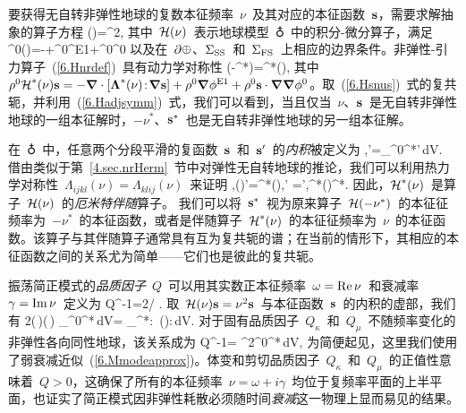 要获得无自转非弹性地球的复数本征频率~$\nu$~及其对应的本征函数~$\bs$，需要求解抽象的算子方程
\eq
\label{6.Hsnus}
\sH(\nu)\bs=\nu^2\bs,
\en
其中~$\sH(\nu)$~表示地球模型~$\earth$~中的积分-微分算子，满足
%
%
\eq
\label{6.Hnrdef}
\rho^0\sH(\nu)\bs=-\bdel\cdot[\bLambda(\nu)\!:\!\bdel\bs]
+\rho^0\bdel\phi^{\rm E1}+\rho^0\bs\cdot\bdel\bdel\phi^0
\en
以及在~$\p\earth$、$\Sigma_{\rm SS}$~和~$\Sigma_{\rm FS}$~上相应的边界条件。非弹性-引力算子~(\ref{6.Hnrdef})~具有动力学对称性
\eq
\label{6.Hadjsymm}
\sH(-\nu^*)=\sH^*(\nu),
\en
其中~$\rho^0\sH^*(\nu)\bs=-\bdel\cdot[\bLambda^*(\nu)\!:\!\bdel\bs]
+\rho^0\bdel\phi^{\rm E1}+\rho^0\bs\cdot\bdel\bdel\phi^0$。取~(\ref{6.Hsnus})~式的复共轭，并利用~(\ref{6.Hadjsymm})~式，我们可以看到，当且仅当~$\nu$、$\bs$~是无自转非弹性地球的一组本征解时，$-\nu^*$、$\bs^*$~也是无自转非弹性地球的另一组本征解。

在~$\earth$~中，任意两个分段平滑的复函数~$\bs$~和~$\bs'$~的{\em 内积\/}被定义为
%
\eq
\label{6.inprod}
\langle\bs,\bs'\rangle=\int_{\subearth}\rho^0\bs^*\cdot\bs'\,dV.
\en
借由类似于第~\ref{4.sec.nrHerm}~节中对弹性无自转地球的推论，我们可以利用热力学对称性~$\Lambda_{ijkl}(\nu)=\Lambda_{klij}(\nu)$~来证明
\eq
\label{6.Hermdef}
\langle\bs,\sH(\nu)\bs'\rangle=\langle\sH^*(\nu)\bs,\bs'\rangle
=\langle\bs',\sH^*(\nu)\bs\rangle^*.
\en
因此，$\sH^*(\nu)$~是算子~$\sH(\nu)$~的{\em 厄米特伴随\/}算子。
%
%
%
我们可以将~$\bs^*$~视为原来算子~$\sH(-\nu^*)$~的本征征频率为~$-\nu^*$~的本征函数，或者是伴随算子~$\sH^*(\nu)$~的本征征频率为~$\nu$~的本征函数。该算子与其伴随算子通常具有互为复共轭的谱；在当前的情形下，其相应的本征函数之间的关系尤为简单——它们也是彼此的复共轭。

振荡简正模式的{\em 品质因子\/}~$Q$~可以用其实数正本征频率~$\omega=\Re{\rm e}\,\nu$~和衰减率~$\gamma=\Im{\rm m}\,\nu$~定义为
%
%
\eq
Q^{-1}=2\gamma / \omega.
\en
取~$\sH(\nu)\bs=\nu^2\bs$~与本征函数~$\bs$~的内积的虚部，我们有
\eq \label{6.ReImnu}
2(\,\nu)(\,\nu)
\int_{\subearth}\rho^0\bs^*\cdot\bs\,dV=
\int_{\subearth}\bdel\bs^*\!:\!
\,\bLambda(\nu)\!:\!\bdel\bs\,dV.
\en
对于固有品质因子~$Q_{\kappa}$~和~$Q_{\mu}$~不随频率变化的非弹性各向同性地球，该关系成为
\eq
\label{6.Qmodeqn}
Q^{-1}=
{\omega^2\displaystyle{\int_{\subearth}}\rho^0\bs^*\cdot\bs\,dV},
\en
为简便起见，这里我们使用了弱衰减近似~(\ref{6.Mmodeapprox})。体变和剪切品质因子~$Q_{\kappa}$~和~$Q_{\mu}$~的正值性意味着~$Q>0$，这确保了所有的本征频率~$\nu=\omega+i\gamma$~均位于复频率平面的上半平面，也证实了简正模式因非弹性耗散必须随时间{\em 衰减\/}这一物理上显而易见的结果。
%

